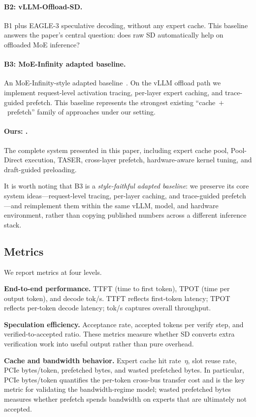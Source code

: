 \paragraph{B2: vLLM-Offload-SD.}
B1 plus EAGLE-3 speculative decoding, without any expert cache. This baseline answers the paper's central question: does raw SD automatically help on offloaded MoE inference?

\paragraph{B3: MoE-Infinity adapted baseline.}
An MoE-Infinity-style adapted baseline~\cite{xue2024moeinfinity}. On the vLLM offload path we implement request-level activation tracing, per-layer expert caching, and trace-guided prefetch. This baseline represents the strongest existing ``cache~$+$~prefetch'' family of approaches under our setting.

\paragraph{Ours: \sysname.}
The complete system presented in this paper, including expert cache pool, Pool-Direct execution, TASER, cross-layer prefetch, hardware-aware kernel tuning, and draft-guided preloading.

It is worth noting that B3 is a \emph{style-faithful adapted baseline}: we preserve its core system ideas---request-level tracing, per-layer caching, and trace-guided prefetch---and reimplement them within the same vLLM, model, and hardware environment, rather than copying published numbers across a different inference stack.

\subsection{Metrics}

We report metrics at four levels.

\textbf{End-to-end performance.} TTFT (time to first token), TPOT (time per output token), and decode tok/s. TTFT reflects first-token latency; TPOT reflects per-token decode latency; tok/s captures overall throughput.

\textbf{Speculation efficiency.} Acceptance rate, accepted tokens per verify step, and verified-to-accepted ratio. These metrics measure whether SD converts extra verification work into useful output rather than pure overhead.

\textbf{Cache and bandwidth behavior.} Expert cache hit rate~$\eta$, slot reuse rate, PCIe bytes/token, prefetched bytes, and wasted prefetched bytes. In particular, PCIe bytes/token quantifies the per-token cross-bus transfer cost and is the key metric for validating the bandwidth-regime model; wasted prefetched bytes measures whether prefetch spends bandwidth on experts that are ultimately not accepted.

